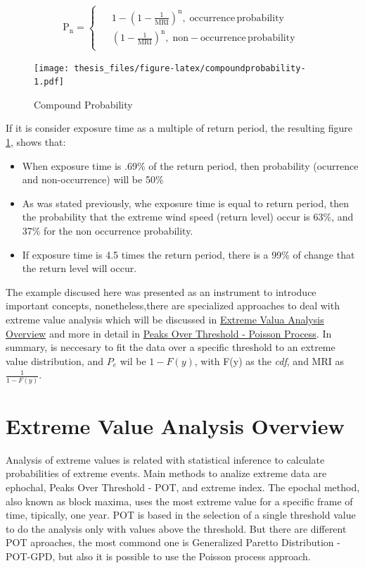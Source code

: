 \documentclass[12pt,twoside]{reedthesis}
\providecommand{\tightlist}{%
  \setlength{\itemsep}{0pt}\setlength{\parskip}{0pt}}
\begin{document}
\[
  \mathrm{
    P_n = 
    \begin{cases}
      \begin{split}
            &1-\left(1-\frac{1}{MRI}\right)^n,\;occurrence\,probability
            \\
            &\left(1-\frac{1}{MRI}\right)^n,\;non-occurrence\,probability
      \end{split}
    \end{cases}
  }
\]

\footnotesize
\begin{figure}
\centering
\texttt{[image: thesis\_files/figure-latex/compoundprobability-1.pdf]}
\caption{\label{fig:compoundprobability}Compound Probability}
\end{figure}
\normalsize

If it is consider exposure time as a multiple of return period, the resulting figure \ref{fig:compoundprobability}, shows that:
\begin{itemize}
\tightlist
\item
  When exposure time is .69\% of the return period, then probability (ocurrence and non-occurrence) will be 50\%
\item
  As was stated previously, whe exposure time is equal to return period, then the probability that the extreme wind speed (return level) occur is 63\%, and 37\% for the non occurrence probability.
\item
  If exposure time is 4.5 times the return period, there is a 99\% of change that the return level will occur.
\end{itemize}
The example discused here was presented as an instrument to introduce important concepts, nonetheless,there are specialized approaches to deal with extreme value analysis which will be discussed in \protect\hyperlink{extremeoverview}{Extreme Valua Analysis Overview} and more in detail in \protect\hyperlink{pot-pp}{Peaks Over Threshold - Poisson Process}. In summary, is neccesary to fit the data over a specific threshold to an extreme value distribution, and \(P_e\) wil be \(1-F(y)\), with F(y) as the \emph{cdf}, and MRI as \(\frac{1}{1-F(y)}\).

\hypertarget{extremeoverview}{%
\section{Extreme Value Analysis Overview}\label{extremeoverview}}

Analysis of extreme values is related with statistical inference to calculate probabilities of extreme events. Main methods to analize extreme data are ephochal, Peaks Over Threshold - POT, and extreme index. The epochal method, also known as block maxima, uses the most extreme value for a specific frame of time, tipically, one year. POT is based in the selection of a single threshold value to do the analysis only with values above the threshold. But there are different POT aproaches, the most commond one is Generalized Paretto Distribution - POT-GPD, but also it is possible to use the Poisson process approach.
\end{document}
